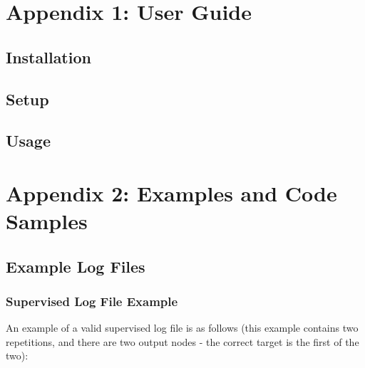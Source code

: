 \documentclass[a4paper]{article}
\begin{document}
\newpage
\section{Appendix 1: User Guide}

\subsection{Installation}%


\subsection{Setup}%


\subsection{Usage}%


\section{Appendix 2: Examples and Code Samples}

\subsection{Example Log Files}%

\subsubsection{Supervised Log File Example}

An example of a valid supervised log file is as follows (this example contains two repetitions, and there are two output nodes - the correct target is the first of the two):
\end{document}
